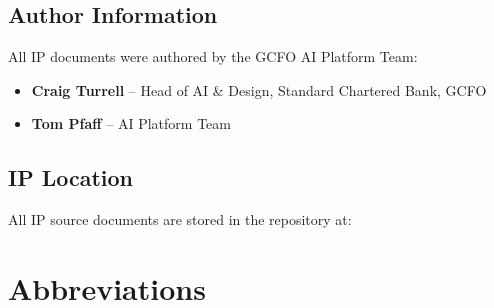 \section*{Author Information}

All IP documents were authored by the GCFO AI Platform Team:

\begin{itemize}[nosep]
    \item \textbf{Craig Turrell} -- Head of AI \& Design, Standard Chartered Bank, GCFO
    \item \textbf{Tom Pfaff} -- AI Platform Team
\end{itemize}

\section*{IP Location}

All IP source documents are stored in the repository at:

\begin{center}
\end{center}

\newpage


\chapter*{Abbreviations}

